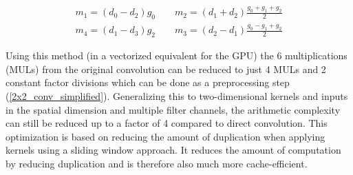 \begin{equation} \label{2x2_conv_simplified}
	\begin{array}{c}
		m_1 = (d_0 - d_2) g_0 \qquad m_2 = (d_1 + d_2) \frac{g_0 + g_1 + g_2}{2} \\[6pt]
		m_4 = (d_1 - d_3) g_2 \qquad m_3 = (d_2 - d_1) \frac{g_0 - g_1 + g_2}{2}
	\end{array}
\end{equation}

Using this method (in a vectorized equivalent for the GPU) the 6 multiplications (MULs) from the original convolution can be reduced to just 4 MULs and 2 constant factor divisions which can be done as a preprocessing step (\autoref{2x2_conv_simplified}). Generalizing this to two-dimensional kernels and inputs in the spatial dimension and multiple filter channels, the arithmetic complexity can still be reduced up to a factor of 4 compared to direct convolution. This optimization is based on reducing the amount of duplication when applying kernels using a sliding window approach. It reduces the amount of computation by reducing duplication and is therefore also much more cache-efficient. \cite{AndrewLavin.2015}